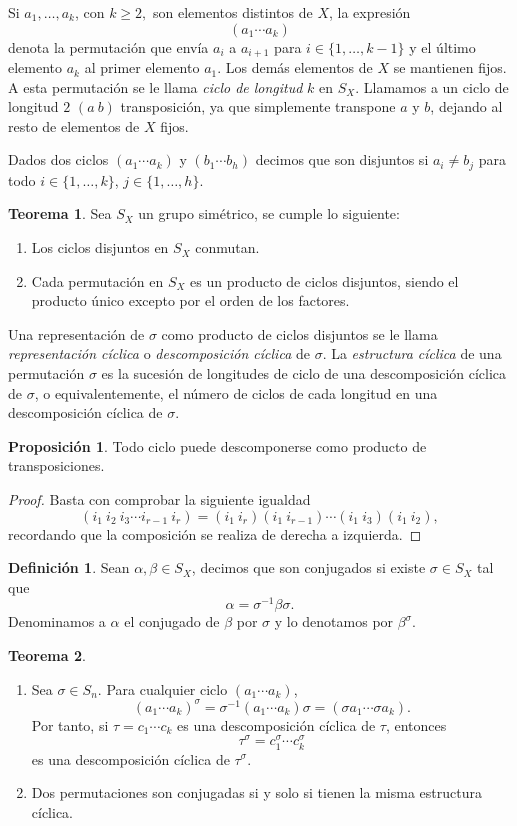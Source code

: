 \documentclass[12pt]{book}
\theoremstyle{definition}
\newtheorem{defi}{Definición}[section]
\newtheorem{teor}{Teorema}[section]
\newtheorem{prop}{Proposición}[section]
\begin{document}
Si $a_1,\ldots,a_k$, con $k\geq 2,$ son elementos distintos de $X$, la expresión
$$(a_1\cdots a_k)$$
denota la permutación que envía $a_i$ a $a_{i+1}$ para $i\in\{1,\ldots,k-1\}$ y el último elemento $a_k$ al primer elemento $a_1$. Los demás elementos de $X$ se mantienen fijos. A esta permutación se le llama \textit{ciclo de longitud} $k$ en $S_X$. Llamamos a un ciclo de longitud $2$ $(a\ b)$ transposición, ya que simplemente transpone $a$ y $b$, dejando al resto de elementos de $X$ fijos.

Dados dos ciclos $(a_1\cdots a_k)$ y $(b_1\cdots b_h)$ decimos que son disjuntos si $a_i\neq b_j$ para todo $i\in\{1,\ldots,k\}$, $j\in\{1,\ldots,h\}$.

\begin{teor}
Sea $S_X$ un grupo simétrico, se cumple lo siguiente:
\begin{enumerate}
\item Los ciclos disjuntos en $S_X$ conmutan.
\item Cada permutación en $S_X$ es un producto de ciclos disjuntos, siendo el producto único excepto por el orden de los factores. 
\end{enumerate}
\label{teor:trans}
\end{teor}
Una representación de $\sigma$ como producto de ciclos disjuntos se le llama \textit{representación cíclica} o \textit{descomposición cíclica} de $\sigma$. La \textit{estructura cíclica} de una permutación $\sigma$ es la sucesión de longitudes de ciclo de una descomposición cíclica de $\sigma$, o equivalentemente, el número de ciclos de cada longitud en una descomposición cíclica de $\sigma$. 
\begin{prop}
Todo ciclo puede descomponerse como producto de transposiciones.
\label{prop:trans}
\end{prop}
\begin{proof} Basta con comprobar la siguiente igualdad
$$(i_1\ i_2\ i_3 \cdots i_{r-1}\ i_r) = (i_1\ i_r)(i_1\ i_{r-1})\cdots(i_1\ i_3)(i_1\ i_2),$$
recordando que la composición se realiza de derecha a izquierda.
\end{proof}

\begin{defi}
Sean $\alpha,\beta\in S_X$, decimos que son conjugados si existe $\sigma\in S_X$ tal que $$\alpha = \sigma^{-1}\beta\sigma.$$
Denominamos a $\alpha$ el conjugado de $\beta$ por $\sigma$ y lo denotamos por $\beta^\sigma$.
\end{defi}


\begin{teor}
\ 

\begin{enumerate}
\item Sea $\sigma\in S_n$. Para cualquier ciclo $(a_1\cdots a_k)$,
$$(a_1 \cdots a_k)^\sigma= \sigma^{-1}(a_1 \cdots a_k)\sigma = (\sigma a_1 \cdots \sigma a_k).$$
Por tanto, si $\tau=c_1\cdots c_k$ es una descomposición cíclica de $\tau$, entonces
$$\tau^\sigma = c_1^\sigma\cdots c_k^\sigma$$
es una descomposición cíclica de $\tau^\sigma$.
\item Dos permutaciones son conjugadas si y solo si tienen la misma estructura cíclica.
\end{enumerate}
\end{teor}
\end{document}
